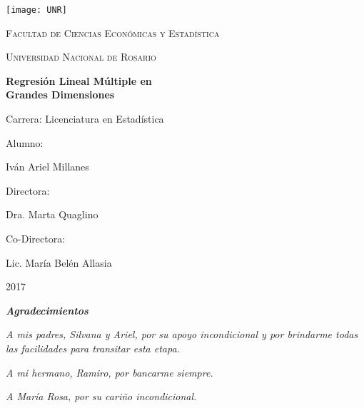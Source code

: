 \documentclass[a4paper,12pt]{report}
\begin{document}
\begin{titlepage}

\begin{center}
\texttt{[image: UNR]}

{\scshape Facultad de Ciencias Económicas y Estadística}

{\scshape Universidad Nacional de Rosario}
\end{center}

\begin{center}
\Huge{\textbf{Regresión Lineal Múltiple en \\ Grandes Dimensiones}}
\end{center}

\begin{center}
{\large{Carrera: Licenciatura en Estadística}}
\end{center}

\vspace{4.5cm}

{
{\large

Alumno:

\hspace{0.5cm} Iván Ariel Millanes

\vspace{0.25cm}
Directora:

\hspace{0.5cm} Dra. Marta Quaglino

\vspace{0.25cm}
Co-Directora:

\hspace{0.5cm} Lic. María Belén Allasia

}
}

\vspace{1cm}
\begin{center}
{\Large{2017}}
\end{center}
\end{titlepage}

\renewcommand{\tablename}{Tabla}

\pagestyle{empty}
\textbf{\textit{{\LARGE Agradecimientos}}}

\vspace{0.5cm}

\textit{A mis padres, Silvana y Ariel, por su apoyo incondicional y por brindarme todas las facilidades para transitar esta etapa.}

\textit{A mi hermano, Ramiro, por bancarme siempre.}

\textit{A María Rosa, por su cariño incondicional.}
\end{document}
